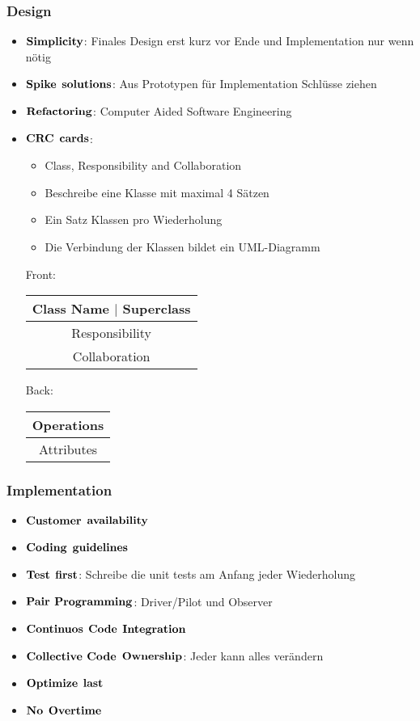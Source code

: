 \subsubsection{Design}
\begin{itemize}
	\item $\bold{Simplicity}$: Finales Design erst kurz vor Ende und Implementation nur wenn nötig
	\item $\bold{Spike}$ $\bold{solutions}$: Aus Prototypen für Implementation Schlüsse ziehen
	\item $\bold{Refactoring}$: Computer Aided Software Engineering
	\item $\bold{CRC}$ $\bold{cards}$:
		\begin{itemize}
			\item Class, Responsibility and Collaboration
			\item Beschreibe eine Klasse mit maximal 4 Sätzen
			\item Ein Satz Klassen pro Wiederholung
			\item Die Verbindung der Klassen bildet ein UML-Diagramm
		\end{itemize}
		\begin{multicols}{2}	
		Front:
		\begin{tabular}{|c|}
			\hline
			Class Name $\vert$ Superclass \\
			\hline
			Responsibility \\
			\hline
			Collaboration \\
			\hline
		\end{tabular}
		\columnbreak
		Back:
		\begin{tabular}{|c|}
			\hline
			Operations \\
			\hline 
			Attributes \\
			\hline
		\end{tabular}
		\end{multicols}
\end{itemize}
\subsubsection{Implementation}
\begin{itemize}
	\item $\bold{Customer}$ $\bold{availability}$
	\item $\bold{Coding}$ $\bold{guidelines}$
	\item $\bold{Test}$ $\bold{first}$: Schreibe die unit tests am Anfang jeder Wiederholung
	\item $\bold{Pair}$ $\bold{Programming}$: Driver/Pilot und Observer
	\item $\bold{Continuos}$ $\bold{Code}$ $\bold{Integration}$
	\item $\bold{Collective}$ $\bold{Code}$ $\bold{Ownership}$: Jeder kann alles verändern
	\item $\bold{Optimize}$ $\bold{last}$
	\item $\bold{No}$ $\bold{Overtime}$
\end{itemize}
